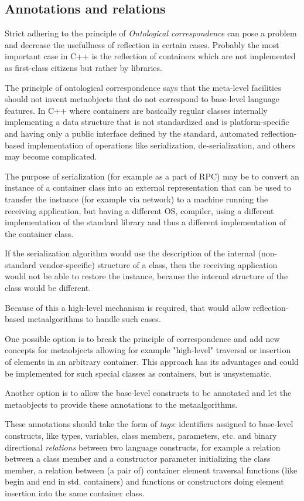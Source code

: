 \subsection{Annotations and relations}
\label{annotations-and-relations}

Strict adhering to the principle of {\em Ontological correspondence} can pose
a problem and decrease the usefullness of reflection in certain cases.
Probably the most important case in C++ is the reflection of containers
which are not implemented as first-class citizens but rather by libraries.

The principle of ontological correspondence says that the meta-level facilities
should not invent metaobjects that do not correspond to base-level
language features. In C++ where containers are basically regular
classes internally implementing a data structure that is not standardized
and is platform-specific and having only a public interface defined 
by the standard, automated reflection-based implementation of operations
like serialization, de-serialization, and others may become complicated.

The purpose of serialization (for example as a part of RPC) may be to
convert an instance of a container class into an external representation
that can be used to transfer the instance (for example via network) 
to a machine running the receiving application, but having a different
OS, compiler, using a different implementation of the standard library
and thus a different implementation of the container class.

If the serialization algorithm would use the description of the internal
(non-standard vendor-specific) structure of a class, then the receiving
application would not be able to restore the instance, because the 
internal structure of the class would be different.

Because of this a high-level mechanism is required, that would allow
reflection-based metaalgorithms to handle such cases.

One possible option is to break the principle of correspondence
and add new concepts for metaobjects allowing for example
"high-level" traversal or insertion of elements in an arbitrary
container. This approach has its advantages and could be implemented
for such special classes as containers, but is unsystematic.

Another option is to allow the base-level constructs to be annotated
and let the metaobjects to provide these annotations to the metaalgorithms.

These annotations should take the form of {\em tags}: identifiers assigned
to base-level constructs, like types, variables, class members, parameters,
etc. and binary directional {\em relations} between two language constructs,
for example a relation between a class member and a constructor parameter
initializing the class member, a relation between (a pair of) container
element traversal functions (like begin and end in std. containers) and 
functions or constructors doing element insertion into the same container
class.
